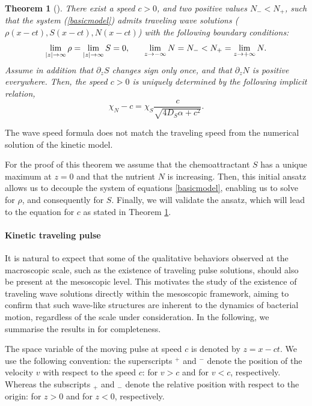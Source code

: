\documentclass[11pt,twoside]{article}
\numberwithin{equation}{section}
\theoremstyle{plain}
\newtheorem{theorem}{Theorem}[section]
\theoremstyle{nonumberplain}
\begin{document}
\begin{theorem}[\cite{calvez2019chemotactic}]\label{thmacro}
There exist a speed $c>0$, and two positive values $N_- < N_+$, such that the system (\ref{basicmodel}) admits traveling wave solutions ($\rho (x- c t), S(x - c t), N(x - c t)$) with the following boundary conditions:
\begin{equation}
    \lim_{|z| \to \infty} \rho = \lim_{|z| \to \infty} S = 0, \hspace{0.6cm} \lim_{z \to -\infty} N = N_- < N_+ = \lim_{z \to + \infty} N.
    \nonumber
\end{equation}
Assume in addition that $\partial_z S$ changes sign only once, and that $\partial_z N$ is positive everywhere. Then, the speed $c > 0$ is uniquely determined by the following implicit relation,
\[
\chi_N - c = \chi_S \frac{c}{\sqrt{4 D_S \alpha + c^2}}.
\]
\end{theorem}
{\color{red} The wave speed formula does not match the traveling speed from the numerical solution of the kinetic model.}

For the proof of this theorem we assume that the chemoattractant $S$ has a unique maximum at $z = 0$ and that the nutrient $N$ is increasing. Then, this initial ansatz allows us to decouple the system of equations \eqref{basicmodel}, enabling us to solve for $\rho$, and consequently for $S$. Finally, we will validate the ansatz, which will lead to the equation for $c$ as stated in Theorem \ref{thmacro}.

\paragraph{Kinetic traveling pulse} It is natural to expect that some of the qualitative behaviors observed at the macroscopic scale, such as the existence of traveling pulse solutions, should also be present at the mesoscopic level. This motivates the study of the existence of traveling wave solutions directly within the mesoscopic framework, aiming to confirm that such wave-like structures are inherent to the dynamics of bacterial motion, regardless of the scale under consideration.
In the following, we summarise the results in \cite{calvez2019chemotactic} for completeness.

The space variable of the moving pulse at speed $c$ is denoted by $z = x-ct$.
We use the following convention: the superscripts $^+$ and $^-$ denote the position of the velocity $v$ with respect to the speed $c$: for $v>c$ and for $v<c$, respectively. Whereas the subscripts $_+$ and $_-$ denote the relative position with respect to the origin: for $z>0$ and for $z<0$, respectively. 
\end{document}
